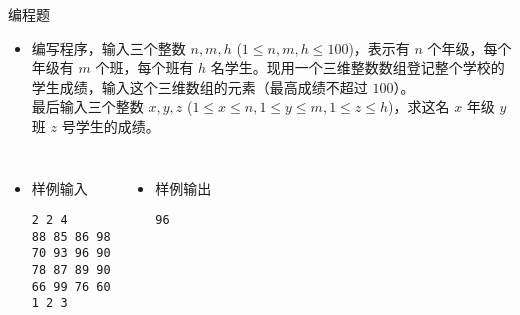 \begin{frame}[fragile]
{\begin{exampleblock}{编程题}
            \begin{itemize}
                \item 编写程序，输入三个整数 $n, m, h$ ($1 \le n, m, h \le 100$)，表示有 $n$ 个年级，每个年级有 $m$ 个班，每个班有 $h$ 名学生。现用一个三维整数数组登记整个学校的学生成绩，输入这个三维数组的元素（最高成绩不超过 $100$）。\\
                    最后输入三个整数 $x, y, z$  ($1 \le x \le n, 1 \le y \le m, 1 \le z \le h$)，求这名 $x$ 年级 $y$ 班 $z$ 号学生的成绩。
            \end{itemize}

            \begin{columns}[onlytextwidth,T]
                \begin{itemize}
                    \item 样例输入

                        \lstinline|2 2 4|\\
                        \lstinline|88 85 86 98|\\
                        \lstinline|70 93 96 90|\\
                        \lstinline|78 87 89 90|\\
                        \lstinline|66 99 76 60|\\
                        \lstinline|1 2 3|\\
                \end{itemize}

                \begin{itemize}
                    \item 样例输出

                        \lstinline|96|
                \end{itemize}
            \end{columns}

        \end{exampleblock}
    }
\end{frame}

